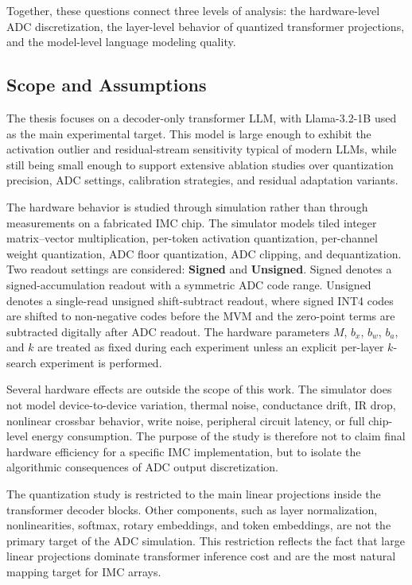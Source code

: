 \documentclass[a4paper,11pt,oneside]{article}
\theoremstyle{breakstyle}
\begin{document}
Together, these questions connect three levels of analysis: the hardware-level ADC discretization, the layer-level behavior of quantized transformer projections, and the model-level language modeling quality.

\subsection{Scope and Assumptions}
\label{subsec:scope_assumptions}

The thesis focuses on a decoder-only transformer LLM, with Llama-3.2-1B used as the main experimental target. This model is large enough to exhibit the activation outlier and residual-stream sensitivity typical of modern LLMs, while still being small enough to support extensive ablation studies over quantization precision, ADC settings, calibration strategies, and residual adaptation variants.

The hardware behavior is studied through simulation rather than through measurements on a fabricated IMC chip. The simulator models tiled integer matrix--vector multiplication, per-token activation quantization, per-channel weight quantization, ADC floor quantization, ADC clipping, and dequantization. Two readout settings are considered: \textbf{Signed} and \textbf{Unsigned}. Signed denotes a signed-accumulation readout with a symmetric ADC code range. Unsigned denotes a single-read unsigned shift-subtract readout, where signed INT4 codes are shifted to non-negative codes before the MVM and the zero-point terms are subtracted digitally after ADC readout. The hardware parameters \(M\), \(b_x\), \(b_w\), \(b_a\), and \(k\) are treated as fixed during each experiment unless an explicit per-layer \(k\)-search experiment is performed.

Several hardware effects are outside the scope of this work. The simulator does not model device-to-device variation, thermal noise, conductance drift, IR drop, nonlinear crossbar behavior, write noise, peripheral circuit latency, or full chip-level energy consumption. The purpose of the study is therefore not to claim final hardware efficiency for a specific IMC implementation, but to isolate the algorithmic consequences of ADC output discretization.

The quantization study is restricted to the main linear projections inside the transformer decoder blocks. Other components, such as layer normalization, nonlinearities, softmax, rotary embeddings, and token embeddings, are not the primary target of the ADC simulation. This restriction reflects the fact that large linear projections dominate transformer inference cost and are the most natural mapping target for IMC arrays.
\end{document}
